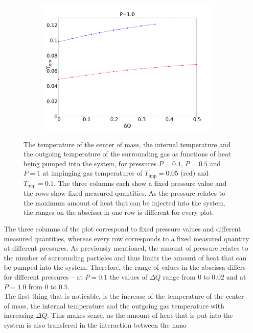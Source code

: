 \documentclass[12pt]{article}
\begin{document}
\begin{figure}[h]
\begin{center}
\begin{subfigure}[t]{0.3\textwidth}
            \includegraphics[scale=0.13]{images/p1_out.pdf}
        \end{subfigure} 
        \caption{The temperature of the center of mass, the internal temperature and the outgoing temperature of the surrounding gas as functions of
            heat being pumped into the system, for pressures
        $P=0.1$, $P=0.5$ and $P=1$ at impinging gas temperatures of $T_\text{imp}=0.05$ (red) and $T_\text{imp}=0.1$. The three columns each show 
        a fixed pressure value and the rows show fixed measured quantities. As the pressure relates to the maximum amount of heat that can be injected
    into the system, the ranges on the abscissa in one row is different for every plot.}
        \label{fig:comintout}
    \end{center}
\end{figure}
The three columns of the plot correspond to fixed pressure values and different measured quantities, whereas every row corresponds to a fixed measured
quantity at different pressures. As previously mentioned, the amount of pressure relates to the number of surrounding particles and thus limits the
amount of heat that can be pumped into the system. Therefore, the range of values in the abscissa differs for different pressures -- at $P=0.1$ the
values of $\Delta Q$ range from $0$ to $0.02$ and at $P=1.0$ from $0$ to $0.5$.\\
The first thing that is noticable, is the increase of the temperature of the center of mass, the internal temperature and the outgoing gas temperature
with increasing $\Delta Q$. This makes sense, as the amount of heat that is put into the system is also transfered in the interaction between the nano
\end{document}
